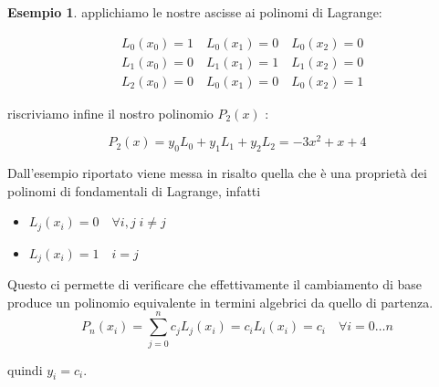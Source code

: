 \documentclass[12pt, a4paper]{book}
\theoremstyle{definition}
\newtheorem{exmp}{Esempio}[section]
\begin{document}
\begin{flushleft}
\begin{exmp}
applichiamo le nostre ascisse ai polinomi di Lagrange:

\[ 
	\begin{split}
		& L_{0}(x_{0}) = 1 \quad L_{0}(x_{1}) = 0 \quad L_{0}(x_{2}) = 0 \\
		& L_{1}(x_{0}) = 0 \quad L_{1}(x_{1}) = 1 \quad L_{1}(x_{2}) = 0 \\
		& L_{2}(x_{0}) = 0 \quad L_{0}(x_{1}) = 0 \quad L_{0}(x_{2}) = 1
	\end{split}
\]

riscriviamo infine il nostro polinomio  $P_{2}(x)$ :

\[ 
	P_{2}(x) = y_{0}L_{0} + y_{1}L_{1} + y_{2}L_{2} = -3x^{2} +x +4
\]
\end{exmp}

Dall'esempio riportato viene messa in risalto quella che è una proprietà  dei polinomi di  fondamentali di Lagrange, infatti 
\begin{itemize}
	\item	 $L_{j}(x_{i}) = 0 \quad  \forall i,j \; i \neq j$
	\item	 $L_{j}(x_{i}) = 1 \quad  i = j$
\end{itemize}

Questo ci permette di verificare che effettivamente il cambiamento di base produce un polinomio equivalente in termini algebrici da quello di partenza.
\[
	P_{n}(x_{i}) = \sum_{j=0}^{n} c_{j}L_{j}(x_{i}) = c_{i}L_{i}(x_{i}) = c_{i} \quad \forall i = 0 \dots n
\]

quindi $y_{i} = c_{i}$.
\end{flushleft}
\end{document}

